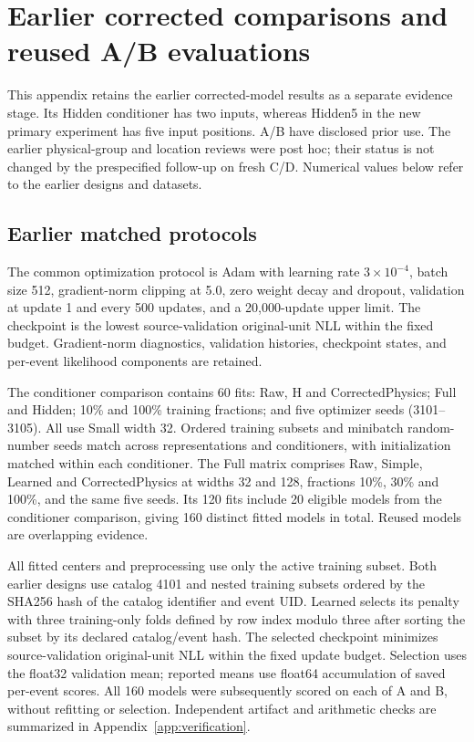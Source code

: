 \section{Earlier corrected comparisons and reused A/B evaluations}
\label{app:earlier_corrected}

This appendix retains the earlier corrected-model results as a separate evidence
stage. Its Hidden conditioner has two inputs, whereas Hidden5 in the new primary
experiment has five input positions. A/B have disclosed prior use. The earlier
physical-group and location reviews were post hoc; their status is not changed
by the prespecified follow-up on fresh C/D. Numerical values below refer to the
earlier designs and datasets.

\subsection{Earlier matched protocols}


The common optimization protocol is Adam with learning rate $3\times10^{-4}$,
batch size 512, gradient-norm clipping at 5.0, zero weight decay and dropout,
validation at update 1 and every 500 updates,
and a 20,000-update upper limit. The checkpoint is the lowest source-validation
original-unit NLL within the fixed budget. Gradient-norm diagnostics, validation histories,
checkpoint states, and per-event likelihood components are retained.

The conditioner comparison contains 60 fits: Raw, H and CorrectedPhysics;
Full and Hidden; 10\% and 100\% training fractions; and five optimizer seeds
(3101--3105). All use Small width 32. Ordered training subsets and minibatch
random-number seeds match across representations and conditioners, with
initialization matched within each conditioner. The Full matrix comprises
Raw, Simple, Learned and CorrectedPhysics at widths 32 and 128, fractions
10\%, 30\% and 100\%, and the same five seeds. Its 120 fits include 20
eligible models from the conditioner comparison, giving 160 distinct fitted
models in total. Reused models are overlapping evidence.

All fitted centers and preprocessing use only the active training subset.
Both earlier designs use catalog 4101 and nested training subsets ordered by
the SHA256 hash of the catalog identifier and event UID.
Learned selects its penalty with three training-only folds defined by row
index modulo three after sorting the subset by its declared catalog/event
hash. The selected checkpoint minimizes source-validation original-unit NLL
within the fixed update budget. Selection uses the float32 validation mean;
reported means use float64 accumulation of saved per-event scores. All 160
models were subsequently scored on each of A and B, without refitting or
selection. Independent artifact and arithmetic checks are summarized in
Appendix~\ref{app:verification}.

